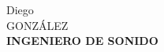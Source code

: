 \fnamefont{}\raggedright Diego\\
\snamefont{}\raggedleft GONZÁLEZ \\[.6\baselineskip]
\sectionfont{}\centering \textbf{INGENIERO DE SONIDO} \\
\rmfamily\normalsize\raggedright